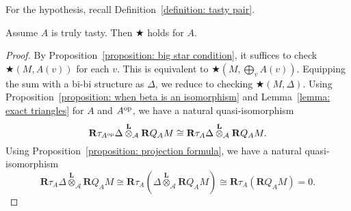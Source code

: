 For the hypothesis, recall Definition~\ref{definition: tasty pair}. 

\begin{proposition} \label{proposition: vanishing of tensor}
  Assume \(A\) is truly tasty. Then \(\bigstar\) holds for \(A\).
\end{proposition}

\begin{proof}
  By Proposition~\ref{proposition: big star condition}, it suffices to check \(\bigstar(M,A(v))\) for each \(v\). This is equivalent to \(\bigstar(M,\bigoplus_v A(v))\). Equipping the sum with a bi-bi structure as \(\Delta\), we reduce to checking \(\bigstar(M,\Delta)\). Using Proposition~\ref{proposition: when beta is an isomorphism} and Lemma~\ref{lemma: exact triangles} for \(A\) and \(A^{\operatorname{op}}\), we have a natural quasi-isomorphism
  \[\mathbf{R}\tau_{A^{\operatorname{op}}} \Delta \overset{\mathbf{L}}{\otimes}_{\mathcal A} \mathbf{R}Q_A M \cong \mathbf{R}\tau_{A} \Delta \overset{\mathbf{L}}{\otimes}_{\mathcal A} \mathbf{R}Q_{A} M.\]
  Using Proposition~\ref{proposition: projection formula}, we have a natural quasi-isomorphism
  \[\mathbf{R}\tau_{A} \Delta \overset{\mathbf{L}}{\otimes}_{\mathcal A} \mathbf{R}Q_{A} M \cong \mathbf{R}\tau_{A} \left( \Delta \overset{\mathbf{L}}{\otimes}_{\mathcal A} \mathbf{R}Q_{A} M  \right) \cong \mathbf{R}\tau_{A} \left( \mathbf{R}Q_{A} M \right) = 0.\]
  
\end{proof}


